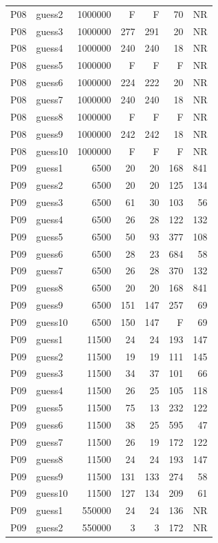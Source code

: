 {\begin{longtable}{llrrrrr}
P08 & guess2 & 1000000 & F & F & 70 & NR \\
P08 & guess3 & 1000000 & 277 & 291 & 20 & NR \\
P08 & guess4 & 1000000 & 240 & 240 & 18 & NR \\
P08 & guess5 & 1000000 & F & F & F & NR \\
P08 & guess6 & 1000000 & 224 & 222 & 20 & NR \\
P08 & guess7 & 1000000 & 240 & 240 & 18 & NR \\
P08 & guess8 & 1000000 & F & F & F & NR \\
P08 & guess9 & 1000000 & 242 & 242 & 18 & NR \\
P08 & guess10 & 1000000 & F & F & F & NR \\
P09 & guess1 & 6500 & 20 & 20 & 168 & 841 \\
P09 & guess2 & 6500 & 20 & 20 & 125 & 134 \\
P09 & guess3 & 6500 & 61 & 30 & 103 & 56 \\
P09 & guess4 & 6500 & 26 & 28 & 122 & 132 \\
P09 & guess5 & 6500 & 50 & 93 & 377 & 108 \\
P09 & guess6 & 6500 & 28 & 23 & 684 & 58 \\
P09 & guess7 & 6500 & 26 & 28 & 370 & 132 \\
P09 & guess8 & 6500 & 20 & 20 & 168 & 841 \\
P09 & guess9 & 6500 & 151 & 147 & 257 & 69 \\
P09 & guess10 & 6500 & 150 & 147 & F & 69 \\
P09 & guess1 & 11500 & 24 & 24 & 193 & 147 \\
P09 & guess2 & 11500 & 19 & 19 & 111 & 145 \\
P09 & guess3 & 11500 & 34 & 37 & 101 & 66 \\
P09 & guess4 & 11500 & 26 & 25 & 105 & 118 \\
P09 & guess5 & 11500 & 75 & 13 & 232 & 122 \\
P09 & guess6 & 11500 & 38 & 25 & 595 & 47 \\
P09 & guess7 & 11500 & 26 & 19 & 172 & 122 \\
P09 & guess8 & 11500 & 24 & 24 & 193 & 147 \\
P09 & guess9 & 11500 & 131 & 133 & 274 & 58 \\
P09 & guess10 & 11500 & 127 & 134 & 209 & 61 \\
P09 & guess1 & 550000 & 24 & 24 & 136 & NR \\
P09 & guess2 & 550000 & 3 & 3 & 172 & NR \\

\end{longtable}}

